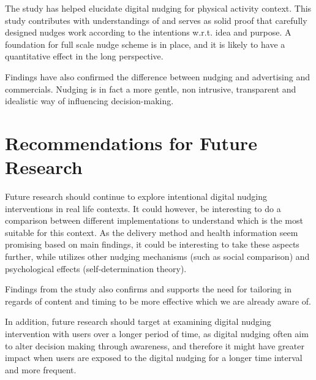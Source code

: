 The study has helped elucidate digital nudging for physical activity context. This study contributes with understandings of and serves as solid proof that carefully designed nudges work according to the intentions w.r.t. idea and purpose. A foundation for full scale nudge scheme is in place, and it is likely to have a quantitative effect in the long perspective.

Findings have also confirmed the difference between nudging and advertising and commercials. Nudging is in fact a more gentle, non intrusive, transparent and idealistic way of influencing decision-making. 


\section{Recommendations for Future Research}
Future research should continue to explore intentional digital nudging interventions in real life contexts. It could however, be interesting to do a comparison between different implementations to understand which is the most suitable for this context. As the delivery method and health information seem promising based on main findings, it could be interesting to take these aspects further, while utilizes other nudging mechanisms (such as social comparison) and psychological effects (self-determination theory). 

Findings from the study also confirms and supports the need for tailoring in regards of content and timing to be more effective which we are already aware of. 

In addition, future research should target at examining digital nudging intervention with users over a longer period of time, as digital nudging often aim to alter decision making through awareness, and therefore it might have greater impact when users are exposed to the digital nudging for a longer time interval and more frequent.

